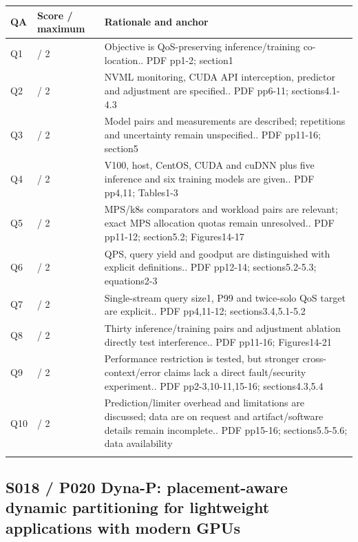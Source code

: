 \begin{longtable}{>{\raggedright\arraybackslash}p{}>{\raggedright\arraybackslash}p{}>{\raggedright\arraybackslash}p{}}
\toprule
\textbf{QA} & \textbf{Score / maximum} & \textbf{Rationale and anchor}\\\midrule\endhead
Q1 & 2 / 2 & Objective is QoS-preserving inference/training co-location.. PDF pp1-2; section1\\\addlinespace
Q2 & 2 / 2 & NVML monitoring, CUDA API interception, predictor and adjustment are specified.. PDF pp6-11; sections4.1-4.3\\\addlinespace
Q3 & 1 / 2 & Model pairs and measurements are described; repetitions and uncertainty remain unspecified.. PDF pp11-16; section5\\\addlinespace
Q4 & 2 / 2 & V100, host, CentOS, CUDA and cuDNN plus five inference and six training models are given.. PDF pp4,11; Tables1-3\\\addlinespace
Q5 & 1 / 2 & MPS/k8s comparators and workload pairs are relevant; exact MPS allocation quotas remain unresolved.. PDF pp11-12; section5.2; Figures14-17\\\addlinespace
Q6 & 2 / 2 & QPS, query yield and goodput are distinguished with explicit definitions.. PDF pp12-14; sections5.2-5.3; equations2-3\\\addlinespace
Q7 & 2 / 2 & Single-stream query size1, P99 and twice-solo QoS target are explicit.. PDF pp4,11-12; sections3.4,5.1-5.2\\\addlinespace
Q8 & 2 / 2 & Thirty inference/training pairs and adjustment ablation directly test interference.. PDF pp11-16; Figures14-21\\\addlinespace
Q9 & 1 / 2 & Performance restriction is tested, but stronger cross-context/error claims lack a direct fault/security experiment.. PDF pp2-3,10-11,15-16; sections4.3,5.4\\\addlinespace
Q10 & 1 / 2 & Prediction/limiter overhead and limitations are discussed; data are on request and artifact/software details remain incomplete.. PDF pp15-16; sections5.5-5.6; data availability\\\addlinespace
\bottomrule\end{longtable}

\clearpage\subsection{S018 / P020 Dyna-P: placement-aware dynamic partitioning for lightweight applications with modern GPUs}

